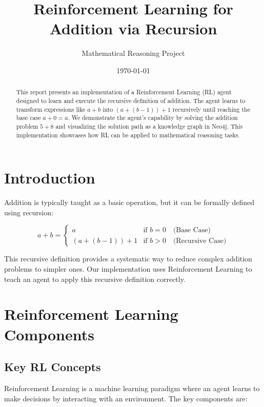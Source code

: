 \documentclass{article}
\title{Reinforcement Learning for Addition via Recursion}
\author{Mathematical Reasoning Project}
\date{\today}
\begin{document}
\maketitle

\begin{abstract}
This report presents an implementation of a Reinforcement Learning (RL) agent designed to learn and execute the recursive definition of addition. The agent learns to transform expressions like $a + b$ into $(a + (b-1)) + 1$ recursively until reaching the base case $a + 0 = a$. We demonstrate the agent's capability by solving the addition problem $5 + 8$ and visualizing the solution path as a knowledge graph in Neo4j. This implementation showcases how RL can be applied to mathematical reasoning tasks.
\end{abstract}

\section{Introduction}

Addition is typically taught as a basic operation, but it can be formally defined using recursion:

\begin{equation}
a + b = 
\begin{cases}
a & \text{if } b = 0 \quad \text{(Base Case)} \\
(a + (b - 1)) + 1 & \text{if } b > 0 \quad \text{(Recursive Case)}
\end{cases}
\end{equation}

This recursive definition provides a systematic way to reduce complex addition problems to simpler ones. Our implementation uses Reinforcement Learning to teach an agent to apply this recursive definition correctly.

\section{Reinforcement Learning Components}

\subsection{Key RL Concepts}

Reinforcement Learning is a machine learning paradigm where an agent learns to make decisions by interacting with an environment. The key components are:
\end{document}
